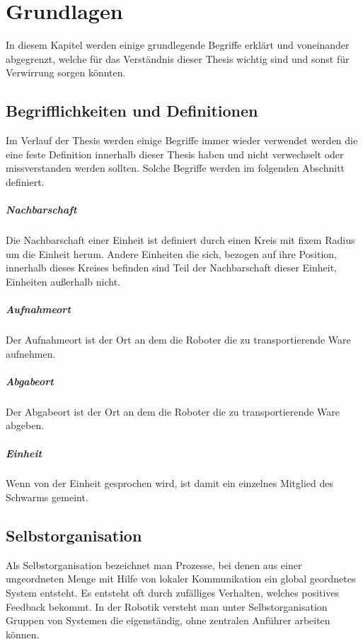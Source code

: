 \chapter{Grundlagen}\label{ch:Grundlagen}
In diesem Kapitel werden einige grundlegende Begriffe erklärt und voneinander abgegrenzt, welche für das Verständnis dieser Thesis wichtig sind und sonst für Verwirrung sorgen könnten.

\section{Begrifflichkeiten und Definitionen}
Im Verlauf der Thesis werden einige Begriffe immer wieder verwendet werden die eine feste Definition innerhalb dieser Thesis haben und nicht verwechselt oder missverstanden werden sollten. Solche Begriffe werden im folgenden Abschnitt definiert.

\paragraph*{Nachbarschaft}
Die Nachbarschaft einer Einheit ist definiert durch einen Kreis mit fixem Radius um die Einheit herum. Andere Einheiten die sich, bezogen auf ihre Position, innerhalb dieses Kreises befinden sind Teil der Nachbarschaft dieser Einheit, Einheiten außerhalb nicht.

\paragraph*{Aufnahmeort}
Der Aufnahmeort ist der Ort an dem die Roboter die zu transportierende Ware aufnehmen.

\paragraph*{Abgabeort}
Der Abgabeort ist der Ort an dem die Roboter die zu transportierende Ware abgeben.

\paragraph*{Einheit}
Wenn von der Einheit gesprochen wird, ist damit ein einzelnes Mitglied des Schwarms gemeint.

\section{Selbstorganisation}\label{sec:Selbstorganisation}
Als Selbstorganisation bezeichnet man Prozesse, bei denen aus einer ungeordneten Menge mit Hilfe von lokaler Kommunikation ein global geordnetes System entsteht.
Es entsteht oft durch zufälliges Verhalten, welches positives Feedback bekommt.
In der Robotik versteht man unter Selbstorganisation Gruppen von Systemen die eigenständig, ohne zentralen Anführer arbeiten können.

